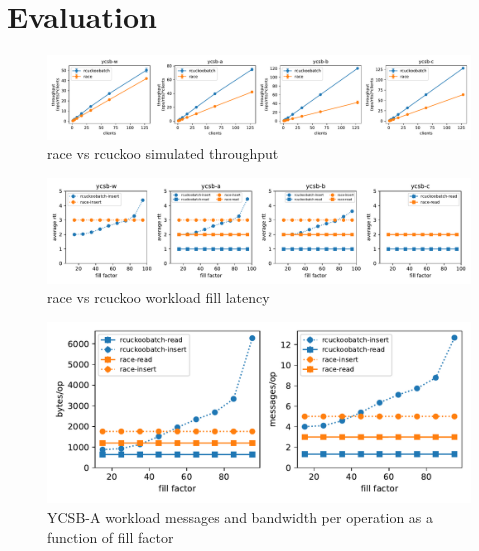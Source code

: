 \section{Evaluation}
\label{sec:eval}

\begin{figure}[ht]
    \includegraphics[width=0.99\linewidth]{fig/hero_ycsb_throughput.pdf}
    \caption{race vs rcuckoo simulated throughput }
    \label{fig:ycsb_throughput}
\end{figure}

\begin{figure}[ht]
    \includegraphics[width=0.99\linewidth]{fig/hero_ycsb_fill_latency.pdf}
    \caption{race vs rcuckoo workload fill latency}
    \label{fig:ycsb_fill_latency}
\end{figure}

\begin{figure}[ht]
    \includegraphics[width=0.99\linewidth]{fig/hero_ycsb_fill_ops_bw.pdf}
    \caption{YCSB-A workload messages and bandwidth per operation as a function of fill factor}
    \label{fig:ycsb_fill_ops_bw}
\end{figure}

